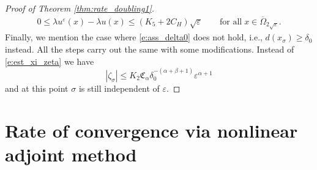 \documentclass[11pt,reqno]{amsart}
\numberwithin{figure}{section}
\theoremstyle{plain}
\theoremstyle{remark}
\numberwithin{equation}{section}
\begin{document}
\begin{proof}[Proof of Theorem \ref{thm:rate_doubling1}]
\begin{align*}
    0 \leq \lambda u^\varepsilon(x) - \lambda u(x) \leq \left(K_5 + 2C_H\right)\sqrt{\varepsilon} \qquad\text{for all}\; x\in \overline{\Omega}_{2\sqrt{\varepsilon}}.
\end{align*}
Finally, we mention the case where \eqref{e:ass_delta0} does not hold, i.e., $d(x_\sigma)\geq \delta_0$ instead. All the steps carry out the same with some modifications. Instead of \eqref{e:est_xi_zeta} we have
\begin{equation*}
    |\zeta_\sigma| \leq K_2\mathfrak{C}_\alpha \delta_0^{-(\alpha+\beta+1)} \varepsilon^{\alpha+1}
\end{equation*}
and at this point $\sigma$ is still independent of $\varepsilon$. 
\end{proof}



\section{Rate of convergence via nonlinear adjoint method}



\end{document}
